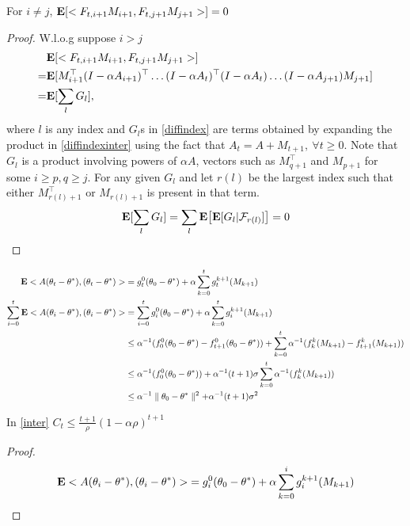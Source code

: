 \begin{lemma}
For $i\neq j$, $\mathbf{E}[<F_{t,i+1}M_{i+1},F_{t,j+1} M_{j+1}>]=0$
\end{lemma}
\begin{proof}
W.l.o.g suppose $i>j$
\begin{align}
&\mathbf{E}[<F_{t,i+1} M_{i+1},F_{t,j+1} M_{j+1}>]\nonumber\\
\label{diffindexinter}=&\mathbf{E}[ M^\top_{i+1}(I-\alpha A_{i+1})^\top\ldots(I-\alpha A_t)^\top(I-\alpha A_t)\ldots(I-\alpha A_{j+1}) M_{j+1}]\\
\label{diffindex}=&\mathbf{E}[ \sum_{l} G_l],
\end{align}
where $l$ is any index and $G_l$s in \eqref{diffindex} are terms obtained by expanding the product in \eqref{diffindexinter} using the fact that $A_t=A+M_{t+1},~\forall t\geq 0$. Note that $G_l$ is a product involving powers of $\alpha A$, vectors such as $M^\top_{q+1}$ and $M_{p+1}$ for some $i\geq p,q\geq j$. For any given $G_l$ and let $r(l)$ be the largest index such that either $M^\top_{r(l)+1}$ or $M_{r(l)+1}$ is present in that term.
\begin{align*}
\mathbf{E}[ \sum_{l} G_l]=  \sum_{l} \mathbf{E}\big[\mathbf{E}[G_l|\mathcal{F}_{r(l)}]\big]=0
\end{align*}
\end{proof}
\begin{align*}
\mathbf{E}<A(\theta_t-\theta^*),(\theta_t-\theta^*)>&=g^0_t(\theta_0-\theta^*)+\alpha\sum_{k=0}^t g^{k+1}_t(M_{k+1})\\
\sum_{i=0}^t\mathbf{E}<A(\theta_i-\theta^*),(\theta_i-\theta^*)>&=\sum_{i=0}^t g^0_i(\theta_0-\theta^*)+\alpha\sum_{k=0}^t g^{k+1}_i(M_{k+1})\\
&\leq\alpha^{-1}(f^0_0(\theta_0-\theta^*)-f^0_{t+1}(\theta_0-\theta^*))+\sum_{k=0}^t \alpha^{-1}(f^k_k(M_{k+1})-f^k_{t+1}(M_{k+1}))\\
&\leq\alpha^{-1}(f^0_0(\theta_0-\theta^*))+\alpha^{-1}(t+1)\sigma\sum_{k=0}^t \alpha^{-1}(f^k_k(M_{k+1}))\\
&\leq\alpha^{-1}\parallel \theta_0-\theta^*\parallel^2+\alpha^{-1}(t+1)\sigma^2
\end{align*}
\begin{lemma}
In \eqref{inter} $C_t\leq \frac{t+1}{\rho}{(1-\alpha\rho)^{t+1}}$
\end{lemma}
\begin{proof}
\begin{align*}
\mathbf{E}<A(\theta_i-\theta^*),(\theta_i-\theta^*)>&=g^0_i(\theta_0-\theta^*)+\alpha\sum_{k=0}^i g^{k+1}_i(M_{k+1})\\
\end{align*}
\end{proof}
